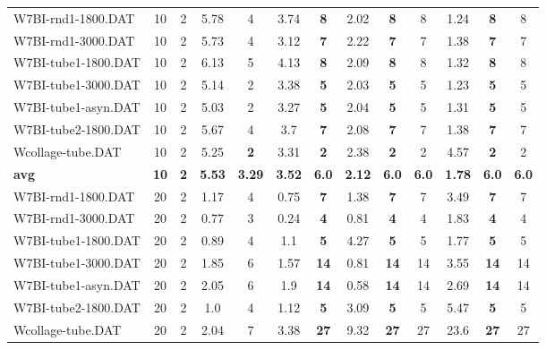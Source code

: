 \begin{table}[h]
{\begin{tabular}{lcccccccccccc}
W7BI-rnd1-1800.DAT & 10 & 2 & 5.78 & 4 & 3.74 &  \textbf{8} & 2.02 &  \textbf{8} & 8 &  \textcolor{blue2}{1.24} &  \textbf{8} & 8 \\
W7BI-rnd1-3000.DAT & 10 & 2 & 5.73 & 4 & 3.12 &  \textbf{7} & 2.22 &  \textbf{7} & 7 &  \textcolor{blue2}{1.38} &  \textbf{7} & 7 \\
W7BI-tube1-1800.DAT & 10 & 2 & 6.13 & 5 & 4.13 &  \textbf{8} & 2.09 &  \textbf{8} & 8 &  \textcolor{blue2}{1.32} &  \textbf{8} & 8 \\
W7BI-tube1-3000.DAT & 10 & 2 & 5.14 & 2 & 3.38 &  \textbf{5} & 2.03 &  \textbf{5} & 5 &  \textcolor{blue2}{1.23} &  \textbf{5} & 5 \\
W7BI-tube1-asyn.DAT & 10 & 2 & 5.03 & 2 & 3.27 &  \textbf{5} & 2.04 &  \textbf{5} & 5 &  \textcolor{blue2}{1.31} &  \textbf{5} & 5 \\
W7BI-tube2-1800.DAT & 10 & 2 & 5.67 & 4 & 3.7 &  \textbf{7} & 2.08 &  \textbf{7} & 7 &  \textcolor{blue2}{1.38} &  \textbf{7} & 7 \\
Wcollage-tube.DAT & 10 & 2 & 5.25 &  \textbf{2} & 3.31 &  \textbf{2} &  \textcolor{blue2}{2.38} &  \textbf{2} & 2 & 4.57 &  \textbf{2} & 2 \\
\cline{1-13} \textbf{avg} & \textbf{10} & \textbf{2} & \textbf{5.53} & \textbf{3.29} & \textbf{3.52} & \textbf{6.0} & \textbf{2.12} & \textbf{6.0} & \textbf{6.0} & \textbf{1.78} & \textbf{6.0} & \textbf{6.0} \\ \cline{1-13}
W7BI-rnd1-1800.DAT & 20 & 2 & 1.17 & 4 &  \textcolor{blue2}{0.75} &  \textbf{7} & 1.38 &  \textbf{7} & 7 & 3.49 &  \textbf{7} & 7 \\
W7BI-rnd1-3000.DAT & 20 & 2 & 0.77 & 3 &  \textcolor{blue2}{0.24} &  \textbf{4} & 0.81 &  \textbf{4} & 4 & 1.83 &  \textbf{4} & 4 \\
W7BI-tube1-1800.DAT & 20 & 2 &  \textcolor{blue2}{0.89} & 4 & 1.1 &  \textbf{5} & 4.27 &  \textbf{5} & 5 & 1.77 &  \textbf{5} & 5 \\
W7BI-tube1-3000.DAT & 20 & 2 & 1.85 & 6 & 1.57 &  \textbf{14} &  \textcolor{blue2}{0.81} &  \textbf{14} & 14 & 3.55 &  \textbf{14} & 14 \\
W7BI-tube1-asyn.DAT & 20 & 2 & 2.05 & 6 & 1.9 &  \textbf{14} &  \textcolor{blue2}{0.58} &  \textbf{14} & 14 & 2.69 &  \textbf{14} & 14 \\
W7BI-tube2-1800.DAT & 20 & 2 &  \textcolor{blue2}{1.0} & 4 & 1.12 &  \textbf{5} & 3.09 &  \textbf{5} & 5 & 5.47 &  \textbf{5} & 5 \\
Wcollage-tube.DAT & 20 & 2 &  \textcolor{blue2}{2.04} & 7 & 3.38 &  \textbf{27} & 9.32 &  \textbf{27} & 27 & 23.6 &  \textbf{27} & 27 \\

\end{tabular}}
\end{table}
